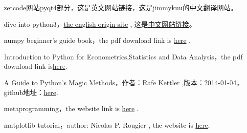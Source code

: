 \documentclass[12pt,oneside]{book}
\begin{document}
\begin{common-format}
\begin{thebibliography}{9}
 zetcode网站pyqt4部分，这是\href{http://zetcode.com/gui/pyqt4/}{英文网站链接}，这是jimmykuu的\href{http://blog.cx125.com/books/PyQt4_Tutorial/}{中文翻译网站}。

 dive into python3，\href{http://www.diveintopython3.net/index.html}{the english origin site} , 这是\href{http://sebug.net/paper/books/dive-into-python3/index.html}{中文网站链接}。

 numpy beginner's guide book，the pdf download link is \href{https://drive.google.com/open?id=0ByWxOeitx54PNXRIMUVybTlLZDQ&authuser=0}{here} . 

 Introduction to Python for Econometrics,Statistics and Data Analysis，the pdf download link is\href{https://drive.google.com/open?id=0ByWxOeitx54PTXN6RW5ydzQ4YXc&authuser=0}{here}.

 A Guide to Python's Magic Methods，作者：Rafe Kettler ,版本：2014-01-04，github地址：\href{https://github.com/RafeKettler/magicmethods}{here}.

 metaprogramming，the website link is \href{http://python-3-patterns-idioms-test.readthedocs.org/en/latest/Metaprogramming.html}{here} .

 matplotlib tutorial，author: Nicolas P. Rougier , the website is  \href{http://www.labri.fr/perso/nrougier/teaching/matplotlib/}{here}.  



\end{thebibliography}




\end{common-format}
\end{document}
